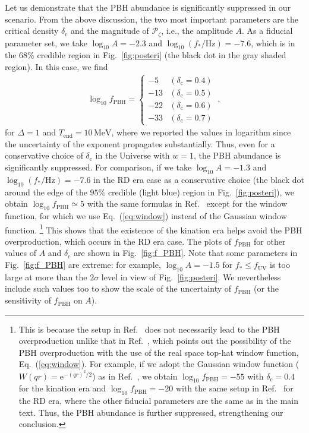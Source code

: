 \documentclass[superscriptaddress, aps, preprintnumbers,
amsmath, amssymb, sort&compress, nofootinbib, 10pt, paper, floatfix]{revtex4-2}
\newcommand{\ee}{\text{e}}
\newcommand{\cc}{\text{c}}
\begin{document}
Let us demonstrate that the PBH abundance is significantly suppressed in our scenario. From the above discussion, the two most important parameters are the critical density $\delta_\text{c}$ and the magnitude of $\mathcal{P}_\zeta$, i.e., the amplitude $A$. 
As a fiducial parameter set, we take $\log_{10}A = -2.3$ and $\log_{10} (f_*/\text{Hz}) = -7.6$, which is in the $68\%$ credible region in Fig.~\ref{fig:posteri} (the black dot in the gray shaded region).
In this case, we find
\begin{align}
    \log_{10} f_\text{PBH} = \begin{cases}
-5 & (\delta_\text{c} = 0.4) \\
-13 & (\delta_\text{c} = 0.5) \\
-22 & (\delta_\text{c} = 0.6) \\
-33 & (\delta_\text{c} = 0.7)
    \end{cases}\ ,
\end{align}
for $\Delta = 1$ and $T_\text{end} = 10 \, \mathrm{MeV}$, where we reported the values in logarithm since the uncertainty of the exponent propagates substantially.  
Thus, even for a conservative choice of $\delta_\text{c}$ in the Universe with $w=1$, the PBH abundance is significantly suppressed. 
For comparison, if we take $\log_{10} A = -1.3$ and $\log_{10}(f_*/\text{Hz}) = -7.6$ in the RD era case as a conservative choice (the black dot around the edge of the $95\%$ credible (light blue) region in Fig.~\ref{fig:posteri}), we obtain $\log_{10}f_\text{PBH} \simeq 5$ with the same formulas in Ref.~\cite{Inomata:2023zup} except for the window function, for which we use Eq.~(\ref{eq:window}) instead of the Gaussian window function.
\footnote{
This is because the setup in Ref.~\cite{Inomata:2023zup} does not necessarily lead to the PBH overproduction unlike that in Ref.~\cite{Franciolini:2023pbf}, which points out the possibility of the PBH overproduction with the use of the real space top-hat window function, Eq.~(\ref{eq:window}).
For example, if we adopt the Gaussian window function ($W(qr) = \ee^{-(qr)^2/2}$) as in Ref.~\cite{Inomata:2023zup}, we obtain $\log_{10} f_\text{PBH} = -55$ with $\delta_\cc = 0.4$ for the kination era and $\log_{10} f_\text{PBH} = -20$ with the same setup in Ref.~\cite{Inomata:2023zup} for the RD era, where the other fiducial parameters are the same as in the main text.
Thus, the PBH abundance is further suppressed, strengthening our conclusion.
}
This shows that the existence of the kination era helps avoid the PBH overproduction, which occurs in the RD era case.
The plots of $f_\text{PBH}$ for other values of $A$ and $\delta_\text{c}$ are shown in Fig.~\ref{fig:f_PBH}. Note that some parameters in Fig.~\ref{fig:f_PBH} are extreme: for example, $\log_{10} A = -1.5$ for $f_* \leq f_\text{UV}$ is too large at more than the $2 \sigma$ level in view of Fig.~\ref{fig:posteri}.  We nevertheless include such values too to show the scale of the uncertainty of $f_\text{PBH}$ (or the sensitivity of $f_\text{PBH}$ on $A$).
 
\end{document}
